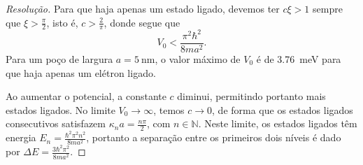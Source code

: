 \begin{proof}[Resolução]
    Para que haja apenas um estado ligado, devemos ter \(c \xi > 1\) sempre que \(\xi > \frac{\pi}{2}\), isto é, \(c > \frac{2}{\pi}\), donde segue que
    \begin{equation*}
        V_0 < \frac{\pi^2 \hbar^2}{8ma^2}.
    \end{equation*}
    Para um poço de largura \(a = \SI{5}{\nano\meter}\), o valor máximo de \(V_0\) é de \SI{3.76}{\milli\electronvolt} para que haja apenas um elétron ligado.

    Ao aumentar o potencial, a constante \(c\) diminui, permitindo portanto mais estados ligados. No limite \(V_0 \to \infty\), temos \(c \to 0\), de forma que os estados ligados consecutivos satisfazem \(\kappa_n a = \frac{n \pi}{2}\), com \(n \in \mathbb{N}\). Neste limite, os estados ligados têm energia \(E_n = \frac{\hbar^2\pi^2n^2}{8ma^2}\), portanto a separação entre os primeiros dois níveis é dado por \(\Delta E = \frac{3\hbar^2 \pi^2}{8 m a^2}\).
\end{proof}
